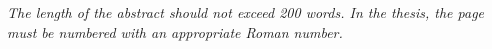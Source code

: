 \textit{The length of the abstract should not exceed 200 words. In the thesis, the page must be numbered with an appropriate Roman number.}